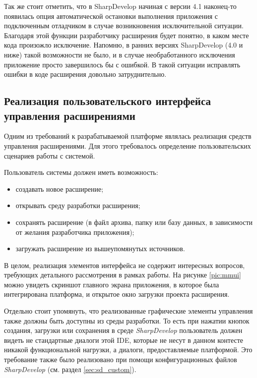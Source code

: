 Так же стоит отметить, что в SharpDevelop начиная с версии 4.1 наконец-то появилась опция автоматической остановки выполнения приложения с подключенным отладчиком в случае возникновения исключительной ситуации. Благодаря этой функции разработчику расширения будет понятно, в каком месте кода произожло исключение. Напомню, в ранних версиях SharpDevelop (4.0 и ниже) такой возможности не было, и в случае необработанного исключения приложение просто завершилось бы с ошибкой. В такой ситуации исправлять ошибки в коде расширения довольно затруднительно. 


\subsection{Реализация пользовательского интерфейса управления расширениями}
\label{sec:macro-gui}

Одним из требований к разрабатываемой платформе являлась реализация средств управления расширениями. Для этого требовалось определение пользовательских сценариев работы с системой.

Пользователь системы должен иметь возможность:

\begin{itemize}
  \item создавать новое расширение;
  \item открывать среду разработки расширения;
  \item сохранять расширение (в файл архива, папку или базу данных, в зависимости от желания разработчика приложения);
  \item загружать расширение из вышеупомянутых источников.
\end{itemize}

В целом, реализация элементов интерфейса не содержит интересных вопросов, требующих детального рассмотрения в рамках работы. На рисунке \ref{pic:mmui} можно увидеть скриншот главного экрана приложения, в которое была интегрирована платформа, и открытое окно загрузки проекта расширения.

Отдельно стоит упомянуть, что реализованные графические элементы управления также должны быть доступны из среды разработки. То есть при нажатии кнопок создания, загрузки или сохранения в среде {\it SharpDevelop} пользователь должен видеть не стандартные диалоги этой IDE, которые не несут в данном контесте никакой функциональной нагрузки, а диалоги, предоставляемые платформой. Это требование также было реализовано при помощи конфигурационных файлов {\it SharpDevelop} (см. раздел \ref{sec:sd_custom}).

